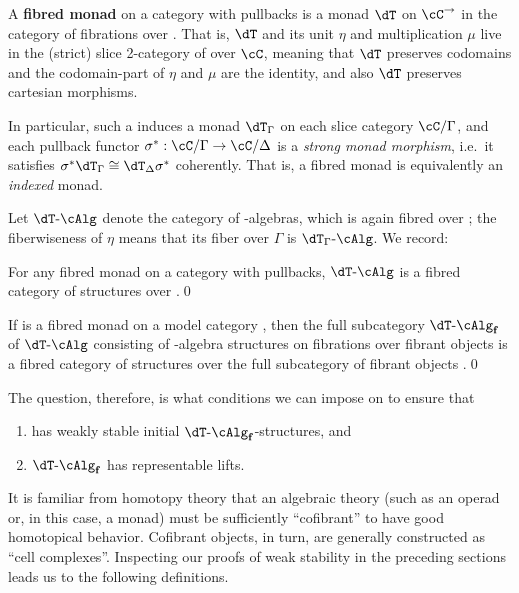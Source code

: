 \documentclass{amsart}
\def\alg{\text{-}\cAlg}
\def\algf{\alg_{\mathbf{f}}}
\let\C\cC
\begin{document}
\begin{defn}
  A \textbf{fibred monad} on a category \C with pullbacks is a monad $\dT$ on $\C^\to$ in the category of fibrations over \C.
  That is, $\dT$ and its unit $\eta$ and multiplication $\mu$ live in the (strict) slice 2-category of \cCat over $\C$, meaning that $\dT$ preserves codomains and the codomain-part of $\eta$ and $\mu$ are the identity, and also $\dT$ preserves cartesian morphisms.
\end{defn}

In particular, such a \dT induces a monad $\dT_\Gamma$ on each slice category $\C/\Gamma$, and each pullback functor $\sigma^* : \C/\Gamma \to \C/\Delta$ is a \emph{strong monad morphism}, i.e.\ it satisfies $\sigma^* \dT_\Gamma \cong \dT_\Delta \sigma^*$ coherently.
That is, a fibred monad is equivalently an \emph{indexed} monad.

Let $\dT\alg$ denote the category of \dT-algebras, which is again fibred over \C; the fiberwiseness of $\eta$ means that its fiber over $\Gamma$ is $\dT_\Gamma\alg$.
We record:

\begin{lem}
  For any fibred monad \dT on a category \C with pullbacks, $\dT\alg$ is a fibred category of structures over \C.\qed
\end{lem}

\begin{lem}
  If \dT is a fibred monad on a model category \sM, then the full subcategory $\dT\algf$ of $\dT\alg$ consisting of \dT-algebra structures on fibrations over fibrant objects is a fibred category of structures over the full subcategory of fibrant objects \Mf.\qed
\end{lem}

The question, therefore, is what conditions we can impose on \dT to ensure that
\begin{enumerate}[label=(\arabic*)]
\item \fibmf has weakly stable initial $\dT\algf$-structures, and
\item $\dT\algf$ has representable lifts.
\end{enumerate}
It is familiar from homotopy theory that an algebraic theory (such as an operad or, in this case, a monad) must be sufficiently ``cofibrant'' to have good homotopical behavior.
Cofibrant objects, in turn, are generally constructed as ``cell complexes''.
Inspecting our proofs of weak stability in the preceding sections leads us to the following definitions.
\end{document}
